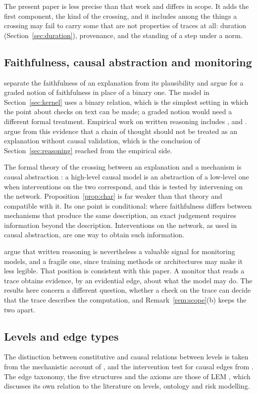 The present paper is less precise than that work and differs in scope. It adds the first
component, the kind of the crossing, and it includes among the things a crossing may fail
to carry some that are not properties of traces at all: duration
(Section~\ref{sec:duration}), provenance, and the standing of a step under a norm.

\subsection{Faithfulness, causal abstraction and monitoring}

\citet{jacovi2020} separate the faithfulness of an explanation from its plausibility and
argue for a graded notion of faithfulness in place of a binary one. The model in
Section~\ref{sec:kernel} uses a binary relation, which is the simplest setting in which
the point about checks on text can be made; a graded notion would need a different
formal treatment. Empirical work on written reasoning includes \citet{turpin2023},
\citet{lanham2023} and \citet{chen2025}. \citet{barez2025} argue from this evidence that
a chain of thought should not be treated as an explanation without causal validation,
which is the conclusion of Section~\ref{sec:reasoning} reached from the empirical side.

The formal theory of the crossing between an explanation and a mechanism is causal
abstraction \citep{geiger2025}: a high-level causal model is an abstraction of a
low-level one when interventions on the two correspond, and this is tested by
intervening on the network. Proposition~\ref{prop:char} is far weaker than that theory
and compatible with it. Its one point is conditional: where faithfulness differs
between mechanisms that produce the same description, an exact judgement requires
information beyond the description. Interventions on the network, as used in causal
abstraction, are one way to obtain such information.

\citet{korbak2025} argue that written reasoning is nevertheless a valuable signal for
monitoring models, and a fragile one, since training methods or architectures may make
it less legible. That position is consistent with this paper. A monitor that reads a
trace obtains evidence, by an evidential edge, about what the model may do. The results
here concern a different question, whether a check on the trace can decide that the
trace describes the computation, and Remark~\ref{rem:scope}(b) keeps the two apart.

\subsection{Levels and edge types}

The distinction between constitutive and causal relations between levels is taken from
the mechanistic account of \citet{craver2007}, and the intervention test for causal
edges from \citet{woodward2003}. The edge taxonomy, the five structures and the axioms
are those of LEM \citep{kreinzlem}, which discusses its own relation to the literature
on levels, ontology and risk modelling.
